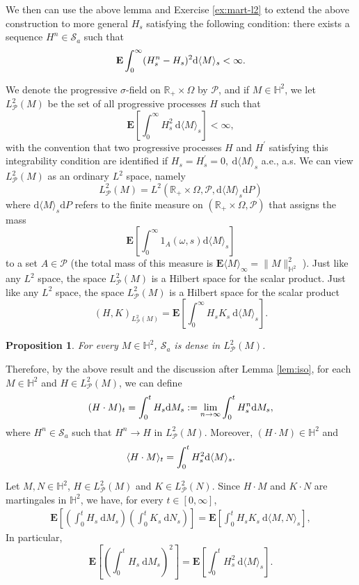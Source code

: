 \documentclass[twoside, 12pt]{book}
\numberwithin{equation}{chapter}
\newtheorem{proposition}[theorem]{Proposition}
\def\cP{{\mathcal P}}
\def\cS{{\mathcal S}}
\def\mH{{\mathbb H}}
\def\bE{{\mathbf E}}
\def\<{\langle}
\def\>{\rangle}
\def\d{\text{\rm{d}}}
\begin{document}
	We then can use the above lemma and Exercise \ref{ex:mart-l2} to extend the above construction to more general $H_s$ satisfying the following condition: there exists a sequence $H^n\in \cS_a$ such that 
	\[
	    \bE \int_0^\infty (H^n_s-H_s)^2 \d \langle M \rangle_s<\infty. 
	\] 
	
	We denote the progressive $\sigma$-field on $\mathbb{R}_{+}\times\Omega$ by $\cP$, and if $M \in \mathbb{H}^2$, we let $L^2_{\cP}(M)$ be the set of all progressive processes $H$ such that
	$$
	\bE\left[\int_0^{\infty} H_s^2 \mathrm{~d}\langle M \rangle_s\right]<\infty,
	$$
	with the convention that two progressive processes $H$ and $H^{\prime}$ satisfying this integrability condition are identified if $H_s=H_s^{\prime}=0, \mathrm{~d}\langle M\rangle_s$ a.e., a.s. We can view $L^2_{\cP}(M)$ as an ordinary $L^2$ space, namely
	$$
	L^2_{\cP}(M)=L^2\left( \mathbb{R}_{+}\times \Omega, \mathscr{P},  \mathrm{d}\langle M \rangle_s \mathrm{d} P\right)
	$$
	where $\mathrm{d}\langle M \rangle_s \mathrm{d} P$ refers to the finite measure on $\left(\mathbb{R}_{+}\times \Omega, \mathscr{P}\right)$ that assigns the mass
	$$
	\bE\left[\int_0^{\infty} 1_A(\omega, s) \mathrm{d}\langle M\rangle_s\right]
	$$
	to a set $A \in \mathscr{P}$ (the total mass of this measure is $\bE \langle M\rangle_{\infty} =\|M\|_{\mathbb{H}^2}^2$ ).
	Just like any $L^2$ space, the space $L^2_{\cP}(M)$ is a Hilbert space for the scalar product. Just like any $L^2$ space, the space $L^2_{\cP}(M)$ is a Hilbert space for the scalar product
	$$
	(H, K)_{L^2_{\cP}(M)}=\bE\left[\int_0^{\infty} H_s K_s \mathrm{~d}\langle M\rangle_s\right]. 
	$$
	
	\begin{proposition}
		For every $M \in \mathbb{H}^2$, $\cS_a$ is dense in $L^2_{\cP}(M)$.
	\end{proposition}
	
	Therefore, by the above result and the discussion after Lemma \ref{lem:iso}, for each $M\in \mH^2$ and $H\in L^2_{\cP}(M)$, we can define 
	\[
	    (H\cdot M)_t=\int_0^t H_s \d M_s:=\lim_{n\to \infty} \int_0^t H^n_s \d M_s, 
	\]
	where $H^n\in \cS_a$ such that $H^n\to H$ in $L^2_{\cP}(M)$. Moreover, $(H\cdot M)\in \mH^2$ and 
	\[
	    \<H\cdot M\>_t= \int_0^t H^2_s \d \<M\>_s. 
	\]
    
	
	Let $M , N \in \mathbb{H}^2$, $H \in L^2_\cP(M)$ and $K \in L^2_{\cP}(N)$. Since $H \cdot M$ and $K \cdot N$ are martingales in $\mathbb{H}^2$, we have, for every $t \in[0, \infty]$,
	$$
	\begin{aligned}
		\bE\left[\left(\int_0^t H_s \mathrm{~d} M_s\right)\left(\int_0^t K_s \mathrm{~d} N_s\right)\right]  = \bE\left[\int_0^t H_s K_s \mathrm{~d}\langle M, N\rangle_s\right],
	\end{aligned}
	$$
	In particular,
	$$
	\bE\left[\left(\int_0^t H_s \mathrm{~d} M_s\right)^2\right]=\bE\left[\int_0^t H_s^2 \mathrm{~d}\langle M\rangle_s\right] .
	$$
	
\end{document}
